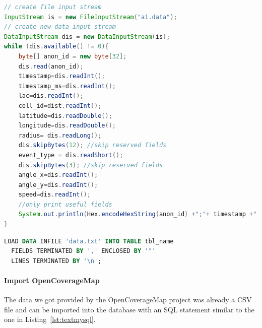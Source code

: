 \begin{lstlisting}[language=Java,style=JAVA,caption={Example code to parse event data stream},label={lst:parsestream}]
// create file input stream
InputStream is = new FileInputStream("a1.data");
// create new data input stream
DataInputStream dis = new DataInputStream(is);
while (dis.available() != 0){
    byte[] anon_id = new byte[32];
    dis.read(anon_id);
    timestamp=dis.readInt();
    timestamp_ms=dis.readInt();
    lac=dis.readInt();
    cell_id=dist.readInt();
    latitude=dis.readDouble();
    longitude=dis.readDouble();
    radius= dis.readLong();
    dis.skipBytes(12); //skip reserved fields
    event_type = dis.readShort();
    dis.skipBytes(3); //skip reserved fields
    angle_x=dis.readInt();
    angle_y=dis.readInt();
    speed=dis.readInt();
    //only print useful fields
    System.out.println(Hex.encodeHexString(anon_id) +";"+ timestamp +";"+lac +";"+cell_id +";"+latitude +";"+longitude +";"+event_type +";"+angle_x);
}
\end{lstlisting}
\begin{lstlisting}[style=htmlcssjs,language=SQL,caption={Load text file into MySQL database},label={lst:textmysql}]
LOAD DATA INFILE 'data.txt' INTO TABLE tbl_name
  FIELDS TERMINATED BY ',' ENCLOSED BY '"'
  LINES TERMINATED BY '\n';
\end{lstlisting}

\paragraph{Import OpenCoverageMap}
The data we got provided by the OpenCoverageMap project was already a CSV file and can be imported into the database with an SQL statement similar to the one in Listing~\ref{lst:textmysql}.
